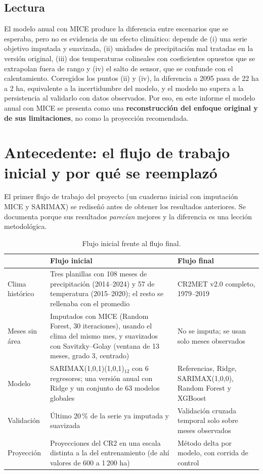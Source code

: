 \documentclass[11pt,a4paper]{article}
\begin{document}
\subsection{Lectura}

El modelo anual con MICE produce la diferencia entre escenarios que se esperaba, pero no es evidencia de un efecto climático: depende de (i) una serie objetivo imputada y suavizada, (ii) unidades de precipitación mal tratadas en la versión original, (iii) dos temperaturas colineales con coeficientes opuestos que se extrapolan fuera de rango y (iv) el salto de sensor, que se confunde con el calentamiento. Corregidos los puntos (ii) y (iv), la diferencia a 2095 pasa de 22 ha a 2 ha, equivalente a la incertidumbre del modelo, y el modelo no supera a la persistencia al validarlo con datos observados. Por eso, en este informe el modelo anual con MICE se presenta como una \textbf{reconstrucción del enfoque original y de sus limitaciones}, no como la proyección recomendada.

\section{Antecedente: el flujo de trabajo inicial y por qué se reemplazó}
\label{sec:antecedente}

El primer flujo de trabajo del proyecto (un cuaderno inicial con imputación MICE y SARIMAX) se rediseñó antes de obtener los resultados anteriores. Se documenta porque sus resultados \emph{parecían} mejores y la diferencia es una lección metodológica.

\begin{table}[H]
\centering
\caption{Flujo inicial frente al flujo final.}
\label{tab:flujos}
\small
\begin{tabular}{p{3.0cm}p{5.8cm}p{5.8cm}}
\toprule
 & Flujo inicial & Flujo final \\
\midrule
Clima histórico & Tres planillas con 108 meses de precipitación (2014--2024) y 57 de temperatura (2015--2020); el resto se rellenaba con el promedio & CR2MET v2.0 completo, 1979--2019 \\
Meses sin área & Imputados con MICE (Random Forest, 30 iteraciones), usando el clima del mismo mes, y suavizados con Savitzky--Golay (ventana de 13 meses, grado 3, centrado) & No se imputa; se usan solo meses observados \\
Modelo & SARIMAX(1,0,1)(1,0,1)$_{12}$ con 6 regresores; una versión anual con Ridge y un conjunto de 63 modelos globales & Referencias, Ridge, SARIMAX(1,0,0), Random Forest y XGBoost \\
Validación & Último 20\,\% de la serie ya imputada y suavizada & Validación cruzada temporal solo sobre meses observados \\
Proyección & Proyecciones del CR2 en una escala distinta a la del entrenamiento (de ahí valores de 600 a 1\,200 ha) & Método delta por modelo, con corrida de control \\
\bottomrule
\end{tabular}
\end{table}
\end{document}
